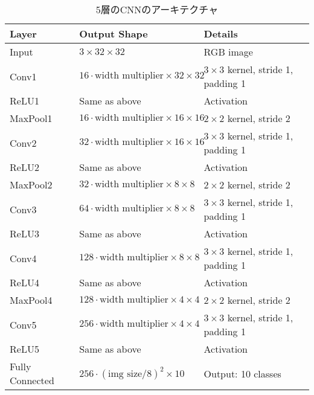 \begin{table}[h]
    \centering
    \caption{5層のCNNのアーキテクチャ}
    \label{tab:cnn5layer}
    \begin{tabular}{lll}
    \toprule
    \textbf{Layer} & \textbf{Output Shape} & \textbf{Details} \\
    \midrule
    Input & $3 \times 32 \times 32$ & RGB image \\
    Conv1 & $16 \cdot \text{width multiplier} \times 32 \times 32$ & $3 \times 3$ kernel, stride 1, padding 1 \\
    ReLU1 & Same as above & Activation \\
    MaxPool1 & $16 \cdot \text{width multiplier} \times 16 \times 16$ & $2 \times 2$ kernel, stride 2 \\
    Conv2 & $32 \cdot \text{width multiplier} \times 16 \times 16$ & $3 \times 3$ kernel, stride 1, padding 1 \\
    ReLU2 & Same as above & Activation \\
    MaxPool2 & $32 \cdot \text{width multiplier} \times 8 \times 8$ & $2 \times 2$ kernel, stride 2 \\
    Conv3 & $64 \cdot \text{width multiplier} \times 8 \times 8$ & $3 \times 3$ kernel, stride 1, padding 1 \\
    ReLU3 & Same as above & Activation \\
    Conv4 & $128 \cdot \text{width multiplier} \times 8 \times 8$ & $3 \times 3$ kernel, stride 1, padding 1 \\
    ReLU4 & Same as above & Activation \\
    MaxPool4 & $128 \cdot \text{width multiplier} \times 4 \times 4$ & $2 \times 2$ kernel, stride 2 \\
    Conv5 & $256 \cdot \text{width multiplier} \times 4 \times 4$ & $3 \times 3$ kernel, stride 1, padding 1 \\
    ReLU5 & Same as above & Activation \\
    Fully Connected & $256 \cdot (\text{img size}/8)^2 \times 10$ & Output: 10 classes \\
    \bottomrule
    \end{tabular}
\end{table}

